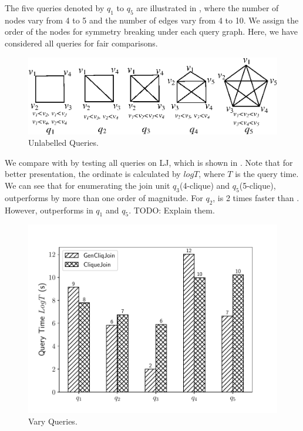  The five queries denoted by $q_1$ to $q_5$ are illustrated in , where the number of nodes vary from 4 to 5 and the number of edges vary from 4 to 10. We assign the order of the nodes for symmetry breaking\cite{Grochow2007} under each query graph. Here, we have considered all queries for fair comparisons.

\begin{figure}[htb]
  \centering
  \includegraphics[scale=0.6]{figures/unlq.eps}
  \caption{\small{Unlabelled Queries.}}
  \label{fig:unlq}
\end{figure}

 We compare \gencliqjoin with \cliquejoin by testing all queries on LJ, which is shown in . Note that for better presentation, the ordinate is calculated by $logT$, where $T$ is the query time. We can see that for enumerating the join unit $q_3$(4-clique) and $q_5$(5-clique), \gencliqjoin outperforms \cliquejoin by more than one order of magnitude. For $q_2$, \gencliqjoin is 2 times faster than \cliquejoin. However, \cliquejoin outperforms \gencliqjoin in $q_1$ and $q_5$. TODO: Explain them.

\begin{figure}[htb]
  \centering
  \includegraphics[scale=0.4]{figures/exp1.pdf}
  \caption{\small{Vary Queries.}}
  \label{fig:vary_query}
\end{figure}

